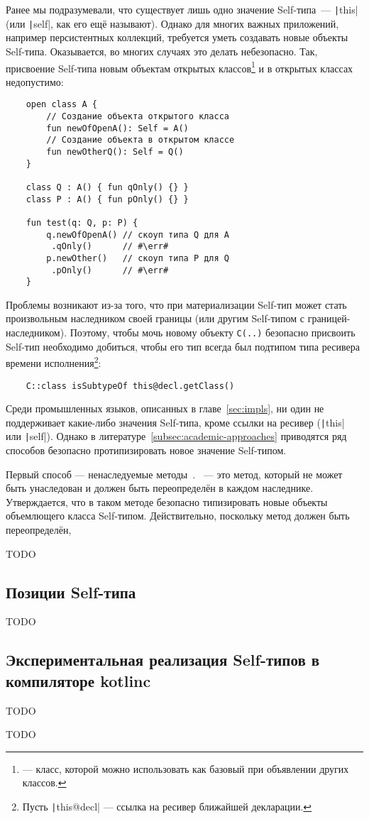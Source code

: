 Ранее мы подразумевали, что существует лишь одно значение Self-типа~--- \texttt|this| (или \texttt|self|, как его ещё называют).
Однако для многих важных приложений, например персистентных коллекций, требуется уметь создавать новые объекты Self-типа.
Оказывается, во многих случаях это делать небезопасно.
Так, присвоение Self-типа новым объектам открытых классов\footnote{ --- класс, которой можно использовать как базовый при объявлении других классов.} и в открытых классах недопустимо:

\begin{verbatim}
    open class A {
        // Создание объекта открытого класса
        fun newOfOpenA(): Self = A()
        // Создание объекта в открытом классе
        fun newOtherQ(): Self = Q()
    }

    class Q : A() { fun qOnly() {} }
    class P : A() { fun pOnly() {} }

    fun test(q: Q, p: P) {
        q.newOfOpenA() // скоуп типа Q для A
         .qOnly()      // #\err#
        p.newOther()   // скоуп типа P для Q
         .pOnly()      // #\err#
    }
\end{verbatim}

Проблемы возникают из-за того, что при материализации Self-тип может стать произвольным наследником своей границы (или другим Self-типом с границей-наследником).
Поэтому, чтобы мочь новому объекту \texttt{C(..)} безопасно присвоить Self-тип необходимо добиться, чтобы его тип всегда был подтипом типа ресивера времени исполнения\footnote{Пусть \texttt|this@decl| --- ссылка на ресивер ближайшей декларации.}:
\begin{verbatim}
    C::class isSubtypeOf this@decl.getClass()
\end{verbatim}

Среди промышленных языков, описанных в главе~\ref{sec:impls}, ни один не поддерживает какие-либо значения Self-типа, кроме ссылки на ресивер (\texttt|this| или \texttt|self|).
Однако в литературе~\ref{subsec:academic-approaches} приводятся ряд способов безопасно протипизировать новое значение Self-типом.

Первый способ --- ненаследуемые методы~\cite{saito2009matching}.
~--- это метод, который не может быть унаследован и должен быть переопределён в каждом наследнике.
Утверждается, что в таком методе безопасно типизировать новые объекты объемлющего класса Self-типом.
Действительно, поскольку метод должен быть переопределён,

TODO %


\subsection{Позиции Self-типа} \label{subsec:self-positions}

TODO %


\subsection{Экспериментальная реализация Self-типов в компиляторе kotlinc}

TODO %

TODO %
